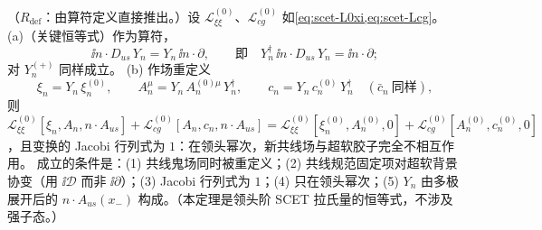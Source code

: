 \begin{theorem}\label{thm:scet-decoupling}
（$R_{\mathrm{def}}$：由算符定义直接推出。）设 $\mathcal L^{(0)}_{\xi\xi}$、$\mathcal L^{(0)}_{cg}$ 如\cref{eq:scet-L0xi,eq:scet-Lcg}。
(a)（关键恒等式）作为算符，
\begin{equation}\label{eq:scet-key}
\ii n\cdot D_{us}\,Y_n=Y_n\,\ii n\cdot\partial,\qquad\text{即}\quad Y_n^\dagger\,\ii n\cdot D_{us}\,Y_n=\ii n\cdot\partial ;
\end{equation}
对 $Y_n^{(+)}$ 同样成立。
(b) 作场重定义
\begin{equation}\label{eq:scet-BPS}
\xi_n=Y_n\,\xi_n^{(0)},\qquad A_n^\mu=Y_n\,A_n^{(0)\mu}\,Y_n^\dagger,\qquad c_n=Y_n\,c_n^{(0)}\,Y_n^\dagger\quad(\bar c_n\ \text{同样}),
\end{equation}
则 $\mathcal L^{(0)}_{\xi\xi}[\xi_n,A_n,n\cdot A_{us}]+\mathcal L^{(0)}_{cg}[A_n,c_n,n\cdot A_{us}]=\mathcal L^{(0)}_{\xi\xi}[\xi^{(0)}_n,A^{(0)}_n,0]+\mathcal L^{(0)}_{cg}[A^{(0)}_n,c^{(0)}_n,0]$，且变换的 Jacobi 行列式为 $1$：在领头幂次，新共线场与超软胶子完全不相互作用。
成立的条件是：(1) 共线鬼场同时被重定义；(2) 共线规范固定项对超软背景协变（用 $\ii\mathcal D$ 而非 $\ii\partial$）；(3) Jacobi 行列式为 $1$；(4) 只在领头幂次；(5) $Y_n$ 由多极展开后的 $n\cdot A_{us}(x_-)$ 构成。（本定理是领头阶 SCET 拉氏量的恒等式，不涉及强子态。）
\end{theorem}

